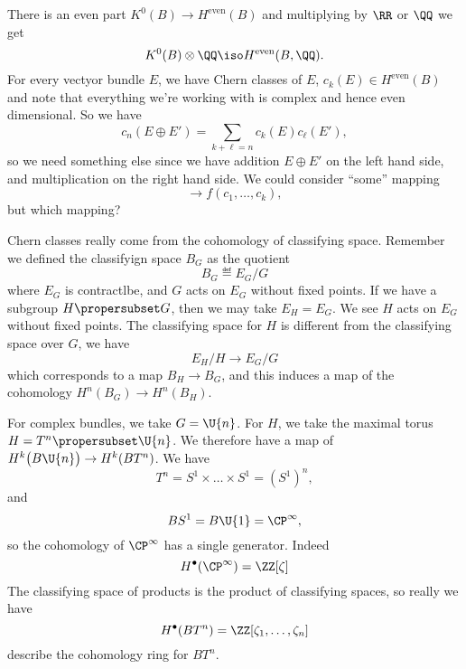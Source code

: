 There is an even part $K^{0}(B)\to H^{\text{even}}(B)$ and
multiplying by $\RR$ or $\QQ$ we get
\begin{equation}
K^{0}(B)\otimes\QQ\iso H^{\text{even}}(B,\QQ).
\end{equation}
For every vectyor bundle $E$, we have Chern classes of $E$,
$c_{k}(E)\in H^{\text{even}}(B)$ and note that everything we're
working with is complex and hence even dimensional. So we have
\begin{equation}
c_{n}(E\oplus E')=\sum_{k+\ell=n}c_{k}(E)c_{\ell}(E'),
\end{equation}
so we need something else since we have addition $E\oplus E'$ on
the left hand side, and multiplication on the right hand side. We
could consider ``some'' mapping
\begin{equation}
[E]\to f(c_1,\dots,c_k),
\end{equation}
but which mapping?

Chern classes really come from the cohomology of classifying space.
Remember we defined the classifyign space $B_{G}$ as the quotient
\begin{equation}
B_{G}\eqdef E_{G}/G
\end{equation}
where $E_{G}$ is contractlbe, and $G$ acts on $E_{G}$ without
fixed points. If we have a subgroup $H\propersubset G$, then we
may take $E_{H}=E_{G}$. We see $H$ acts on $E_{G}$ without fixed
points. The classifying space for $H$ is different from the
classifying space over $G$, we have
\begin{equation}
E_{H}/H\to E_{G}/G
\end{equation}
which corresponds to a map $B_{H}\to B_{G}$, and this induces a
map of the cohomology $H^{n}(B_{G})\to H^{n}(B_{H})$.

For complex bundles, we take $G=\U{n}$. For $H$, we take the
maximal torus $H=T^{n}\propersubset\U{n}$. We therefore have a
map of
$H^{k}\bigl(B\U{n}\bigr)\to H^{k}(BT^{n})$. We have
\begin{equation}
T^{n}=S^{1}\times\dots\times S^{1}=(S^{1})^{n},
\end{equation}
and
\begin{equation}
BS^{1}=B\U{1}=\CP^{\infty},
\end{equation}
so the cohomology of $\CP^{\infty}$\index{$\CP^{\infty}$} has a single
generator. Indeed
\begin{equation}
H^{\bullet}(\CP^{\infty})=\ZZ[\zeta]
\end{equation}
The classifying space of products is the product of classifying
spaces, so really we have
\begin{equation}
H^{\bullet}(BT^{n})=\ZZ[\zeta_{1},\dots,\zeta_{n}]
\end{equation}
describe the cohomology ring for $BT^n$.

